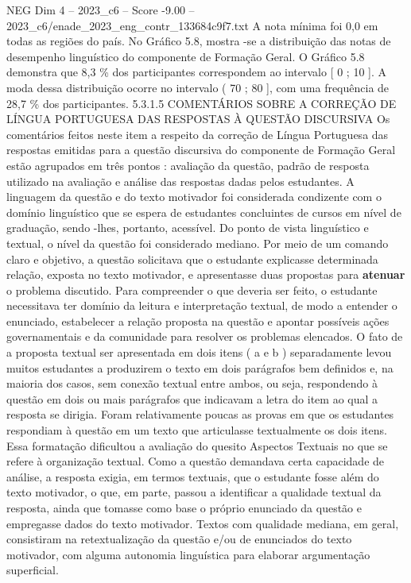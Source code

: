 \begin{textsample}{NEG Dim 4 – 2023\_c6 – Score -9.00 – 2023\_c6/enade\_2023\_eng\_contr\_133684c9f7.txt}
A nota mínima foi 0,0 em todas as regiões do país.
No Gráfico 5.8, mostra -se a distribuição das notas de desempenho linguístico do componente de Formação Geral.
O Gráfico 5.8 demonstra que 8,3 \% dos participantes correspondem ao intervalo [ 0 ; 10 ].
A moda dessa distribuição ocorre no intervalo ( 70 ; 80 ], com uma frequência de 28,7 \% dos participantes. 5.3.1.5 COMENTÁRIOS SOBRE A CORREÇÃO DE LÍNGUA PORTUGUESA DAS RESPOSTAS À QUESTÃO DISCURSIVA Os comentários feitos neste item a respeito da correção de Língua Portuguesa das respostas emitidas para a questão discursiva do componente de Formação Geral estão agrupados em três pontos : avaliação da questão, padrão de resposta utilizado na avaliação e análise das respostas dadas pelos estudantes.
A linguagem da questão e do texto motivador foi considerada condizente com o domínio linguístico que se espera de estudantes concluintes de cursos em nível de graduação, sendo -lhes, portanto, acessível.
Do ponto de vista linguístico e textual, o nível da questão foi considerado mediano.
Por meio de um comando claro e objetivo, a questão solicitava que o estudante explicasse determinada relação, exposta no texto motivador, e apresentasse duas propostas para \textbf{atenuar} o problema discutido.
Para compreender o que deveria ser feito, o estudante necessitava ter domínio da leitura e interpretação textual, de modo a entender o enunciado, estabelecer a relação proposta na questão e apontar possíveis ações governamentais e da comunidade para resolver os problemas elencados.
O fato de a proposta textual ser apresentada em dois itens ( a e b ) separadamente levou muitos estudantes a produzirem o texto em dois parágrafos bem definidos e, na maioria dos casos, sem conexão textual entre ambos, ou seja, respondendo à questão em dois ou mais parágrafos que indicavam a letra do item ao qual a resposta se dirigia.
Foram relativamente poucas as provas em que os estudantes respondiam à questão em um texto que articulasse textualmente os dois itens.
Essa formatação dificultou a avaliação do quesito Aspectos Textuais no que se refere à organização textual.
Como a questão demandava certa capacidade de análise, a resposta exigia, em termos textuais, que o estudante fosse além do texto motivador, o que, em parte, passou a identificar a qualidade textual da resposta, ainda que tomasse como base o próprio enunciado da questão e empregasse dados do texto motivador.
Textos com qualidade mediana, em geral, consistiram na retextualização da questão e/ou de enunciados do texto motivador, com alguma autonomia linguística para elaborar argumentação superficial.

\end{textsample}
